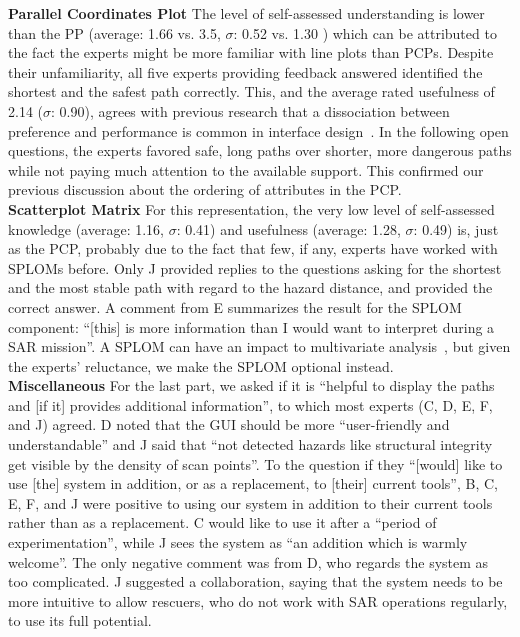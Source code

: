 \documentclass{egpubl}
\begin{document}
%
\textbf{Parallel Coordinates Plot} The level of self-assessed understanding is lower than the PP (average: 1.66 vs. 3.5, $\sigma$: 0.52 vs. 1.30 ) which can be attributed to the fact the experts might be more familiar with line plots than PCPs. Despite their unfamiliarity, all five experts providing feedback answered identified the shortest and the safest path correctly. This, and the average rated usefulness of 2.14 ($\sigma$: 0.90),  agrees with previous research that a dissociation between preference and performance is common in interface design~\cite{andre1995users}. In the following open questions, the experts favored safe, long paths over shorter, more dangerous paths while not paying much attention to the available support. This confirmed our previous discussion about the ordering of attributes in the PCP.\\
%
\textbf{Scatterplot Matrix} For this representation, the very low level of self-assessed knowledge (average: 1.16, $\sigma$: 0.41) and usefulness (average: 1.28, $\sigma$: 0.49) is, just as the PCP, probably due to the fact that few, if any, experts have worked with SPLOMs before. Only J provided replies to the questions asking for the shortest and the most stable path with regard to the hazard distance, and provided the correct answer. A comment from E summarizes the result for the SPLOM component: ``[this] is more information than I would want to interpret during a SAR mission''. A SPLOM can have an impact to multivariate analysis~\cite{6064985}, but given the experts' reluctance, we make the SPLOM optional instead.\\
%
\noindent \textbf{Miscellaneous} For the last part, we asked if it is ``helpful to display the paths and [if it] provides additional information'', to which most experts (C, D, E, F, and J) agreed. D noted that the GUI should be more ``user-friendly and understandable'' and J said that ``not detected hazards like structural integrity get visible by the density of scan points''. To the question if they ``[would] like to use [the] system in addition, or as a replacement, to [their] current tools'', B, C, E, F, and J were positive to using our system in addition to their current tools rather than as a replacement. C would like to use it after a ``period of experimentation'', while J sees the system as ``an addition which is warmly welcome''. The only negative comment was from D, who regards the system as too complicated. J suggested a collaboration, saying that the system needs to be more intuitive to allow rescuers, who do not work with SAR operations regularly, to use its full potential.
\end{document}
